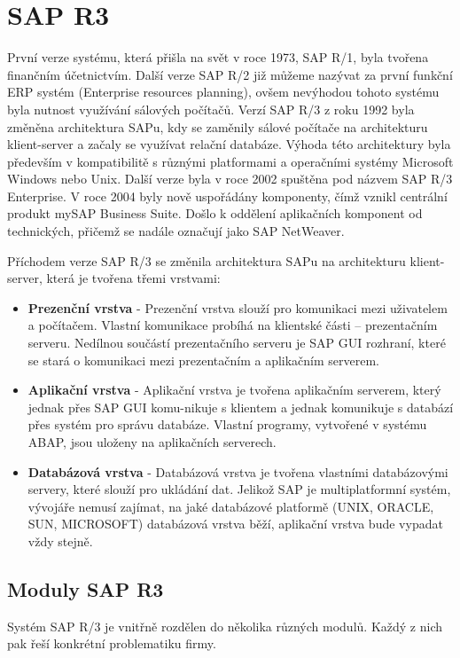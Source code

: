 \documentclass[thesis=M,czech]{FITthesis}[2012/06/26]
\begin{document}
\section{SAP R3}

První verze systému, která přišla na svět v roce 1973, SAP R/1, byla tvořena finančním účetnictvím. Další verze SAP R/2 již můžeme nazývat za první funkční ERP systém (Enterprise resources planning), ovšem nevýhodou tohoto systému byla nutnost využívání sálových počítačů. Verzí SAP R/3 z roku 1992 byla změněna architektura SAPu, kdy se zaměnily sálové počítače na architekturu klient-server a začaly se využívat relační databáze. Výhoda této architektury byla především v kompatibilitě s různými platformami a operačními systémy Microsoft Windows nebo Unix. Další verze byla v roce 2002 spuštěna pod názvem SAP R/3 Enterprise. V roce 2004 byly nově uspořádány komponenty, čímž vznikl centrální produkt mySAP Business Suite. Došlo k oddělení aplikačních komponent od technických, přičemž se nadále označují jako SAP NetWeaver.

Příchodem verze SAP R/3 se změnila architektura SAPu na architekturu klient-server, která je tvořena třemi vrstvami:
\begin{itemize}
	\item
	\textbf{Prezenční vrstva} - Prezenční vrstva slouží pro komunikaci mezi uživatelem a počítačem. Vlastní komunikace probíhá na klientské části – prezentačním serveru. Nedílnou součástí prezentačního serveru je SAP GUI rozhraní, které se stará o komunikaci mezi prezentačním a aplikačním serverem.
	\item
	\textbf{Aplikační vrstva} - Aplikační vrstva je tvořena aplikačním serverem, který jednak přes SAP GUI komu-nikuje s klientem a jednak komunikuje s databází přes systém pro správu databáze. Vlastní programy, vytvořené v systému ABAP, jsou uloženy na aplikačních serverech.
	\item
	\textbf{Databázová vrstva} - Databázová vrstva je tvořena vlastními databázovými servery, které slouží pro ukládání dat. Jelikož SAP je multiplatformní systém, vývojáře nemusí zajímat, na jaké databázové platformě (UNIX, ORACLE, SUN, MICROSOFT) databázová vrstva běží, aplikační vrstva bude vypadat vždy stejně.
\end{itemize} 	

\subsection{Moduly SAP R3}
Systém SAP R/3 je vnitřně rozdělen do několika různých modulů. Každý z nich pak řeší konkrétní problematiku firmy.
\end{document}
